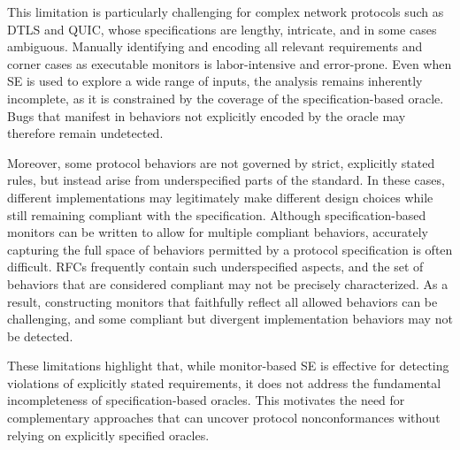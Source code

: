 This limitation is particularly challenging for complex network protocols such as DTLS and QUIC, whose specifications are lengthy, intricate, and in some cases ambiguous.
Manually identifying and encoding all relevant requirements and corner cases as executable monitors is labor-intensive and error-prone.
Even when SE is used to explore a wide range of inputs, the analysis remains inherently incomplete, as it is constrained by the coverage of the specification-based oracle.
Bugs that manifest in behaviors not explicitly encoded by the oracle may therefore remain undetected.

Moreover, some protocol behaviors are not governed by strict, explicitly stated rules, but instead arise from underspecified parts of the standard.
In these cases, different implementations may legitimately make different design choices while still remaining compliant with the specification. 
Although specification-based monitors can be written to allow for multiple compliant behaviors, accurately capturing the full space of behaviors permitted by a protocol specification is often difficult.
RFCs frequently contain such underspecified aspects, and the set of behaviors that are considered compliant may not be precisely characterized.
As a result, constructing monitors that faithfully reflect all allowed behaviors can be challenging, and some compliant but divergent implementation behaviors may not be detected.

These limitations highlight that, while monitor-based SE is effective for detecting violations of explicitly stated requirements, it does not address the fundamental incompleteness of specification-based oracles.
This motivates the need for complementary approaches that can uncover protocol nonconformances without relying on explicitly specified oracles.